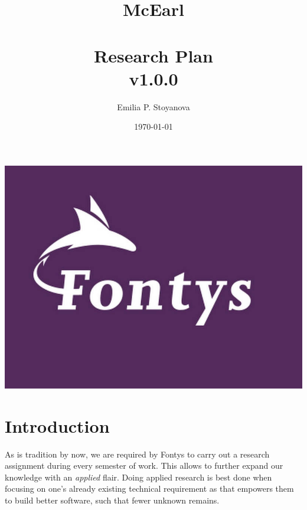 \documentclass{article}
\title{\textbf{McEarl} \\ \hfill \\ \large Research Plan \\ \large v1.0.0}
\author{Emilia P. Stoyanova}
\date{\today}
\begin{document}
\maketitle
\begin{center}
    \includegraphics[width=\textwidth,height=\textheight,keepaspectratio]{res/fontys.jpg}
\end{center}

\newpage
\tableofcontents
\listoftables

\fancyhead[l]{}
\fancyfoot[c]{\thepage}

\newpage
\section{Introduction}
\label{section:introduction}
    As is tradition by now, we are required by Fontys to carry out a research assignment during every semester of work. This allows to further expand our knowledge with an \textit{applied} flair. Doing applied research is best done when focusing on one's already existing technical requirement as that empowers them to build better software, such that fewer unknown remains.
\end{document}
